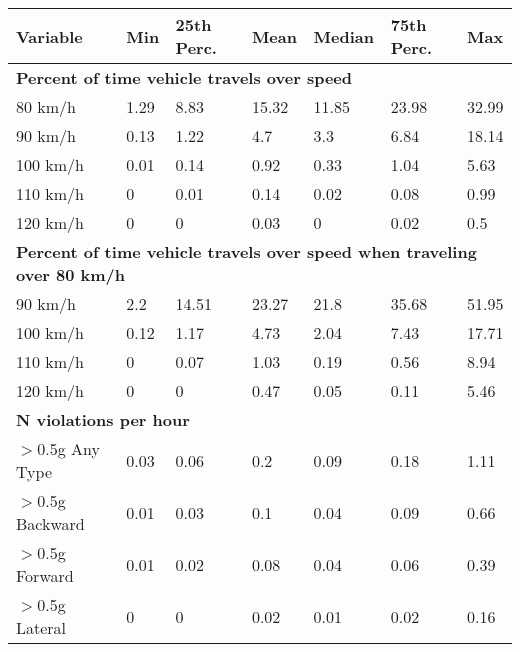 \begin{tabular}{lllllll} \hline Variable & Min & 25th Perc. & Mean & Median & 75th Perc. & Max \\ 
\hline \multicolumn{7}{l}{\textbf{Percent of time vehicle travels over speed}} \\ 
80 km/h & 1.29 & 8.83 & 15.32 & 11.85 & 23.98 & 32.99 \\ 
 90 km/h & 0.13 & 1.22 & 4.7 & 3.3 & 6.84 & 18.14 \\ 
 100 km/h & 0.01 & 0.14 & 0.92 & 0.33 & 1.04 & 5.63 \\ 
 110 km/h & 0 & 0.01 & 0.14 & 0.02 & 0.08 & 0.99 \\ 
 120 km/h & 0 & 0 & 0.03 & 0 & 0.02 & 0.5 \\ 
\hline \multicolumn{7}{l}{\textbf{Percent of time vehicle travels over speed when traveling over 80 km/h}} \\ 
90 km/h & 2.2 & 14.51 & 23.27 & 21.8 & 35.68 & 51.95 \\ 
 100 km/h & 0.12 & 1.17 & 4.73 & 2.04 & 7.43 & 17.71 \\ 
 110 km/h & 0 & 0.07 & 1.03 & 0.19 & 0.56 & 8.94 \\ 
 120 km/h & 0 & 0 & 0.47 & 0.05 & 0.11 & 5.46 \\ 
\hline \multicolumn{7}{l}{\textbf{N violations per hour}} \\ 
$>$0.5g Any Type & 0.03 & 0.06 & 0.2 & 0.09 & 0.18 & 1.11 \\ 
 $>$0.5g Backward & 0.01 & 0.03 & 0.1 & 0.04 & 0.09 & 0.66 \\ 
 $>$0.5g Forward & 0.01 & 0.02 & 0.08 & 0.04 & 0.06 & 0.39 \\ 
 $>$0.5g Lateral & 0 & 0 & 0.02 & 0.01 & 0.02 & 0.16 \\ 
\hline \end{tabular} 